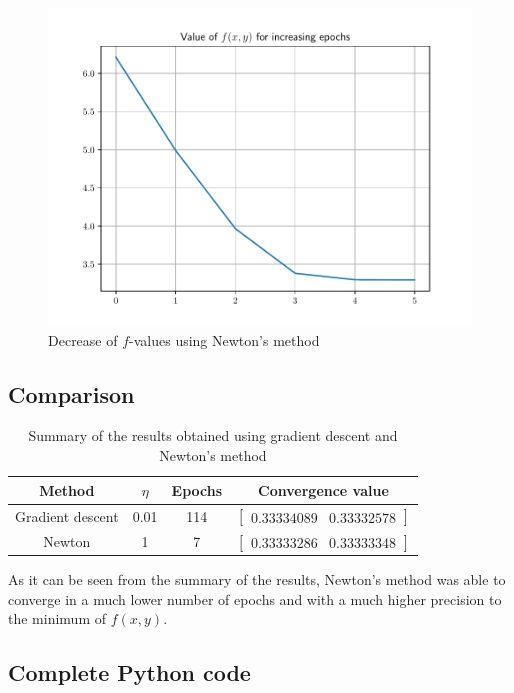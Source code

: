 \documentclass[letterpaper,headings=standardclasses]{scrartcl}
\begin{document}
\begin{figure}[H]
\centering
\includegraphics[width=.6\linewidth]{nm_fval.pdf}
\caption{Decrease of $f$-values using Newton's method}
\label{nm_fval}
\end{figure}

\subsection{Comparison}

\begin{table}[h]
\centering
\begin{tabular}{|c|c|c|c|}
\hline
Method           & $\eta$ & Epochs & Convergence value \\ \hline
Gradient descent & 0.01   & 114    & $[\begin{matrix} 0.33334089 & 0.33332578 \end{matrix}]$ \\ \hline
Newton           & 1      & 7      & $[\begin{matrix} 0.33333286 & 0.33333348 \end{matrix}]$ \\ \hline
\end{tabular}
\caption{Summary of the results obtained using gradient descent and Newton's method}
\label{summ_res}
\end{table}

As it can be seen from the summary of the results, Newton's method was able to converge in a much lower number of epochs and with a much higher precision to the minimum of $f(x,y)$.

\subsection{Complete Python code}


\end{document}
